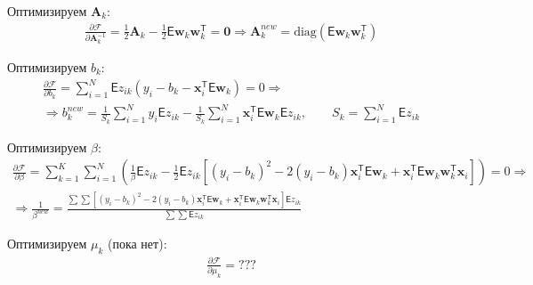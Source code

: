\documentclass[12pt, twoside]{article}
\numberwithin{equation}{section}
\begin{document}
Оптимизируем $\textbf{A}_k$:
\begin{equation}
\label{eq:st:20}
\begin{aligned}
\frac{\partial\mathcal{F}}{\partial\textbf{A}_k^{-1}} = \frac{1}{2}\textbf{A}_k -\frac{1}{2}\mathsf{E}\textbf{w}_k\textbf{w}_k^{\mathsf{T}} = \textbf{0}\Rightarrow \textbf{A}_k^{new} = \text{diag}(\mathsf{E}\textbf{w}_k\textbf{w}_k^{\mathsf{T}})
\end{aligned}
\end{equation}

Оптимизируем $b_k$:
\begin{equation}
\label{eq:st:21}
\begin{aligned}
\frac{\partial\mathcal{F}}{\partial b_k} = \sum_{i=1}^{N}\mathsf{E}z_{ik}\left(y_i-b_k -\textbf{x}_i^{\mathsf{T}}\mathsf{E}\textbf{w}_k\right) = 0 \Rightarrow \\
\Rightarrow b_k^{new}  = \frac{1}{S_k}\sum_{i=1}^{N}y_i\mathsf{E}z_{ik} -\frac{1}{S_k}\sum_{i=1}^{N}\textbf{x}_i^{\mathsf{T}}\mathsf{E}\textbf{w}_k\mathsf{E}z_{ik}, \qquad S_k = \sum_{i=1}^{N}\mathsf{E}z_{ik}
\end{aligned}
\end{equation}

Оптимизируем $\beta$:
\begin{equation}
\label{eq:st:22}
\begin{aligned}
\frac{\partial \mathcal{F}}{\partial \beta} = \sum_{k=1}^{K}\sum_{i=1}^{N}\left(\frac{1}{\beta}\mathsf{E}z_{ik} - \frac{1}{2}\mathsf{E}z_{ik}\left[\left(y_i-b_k\right)^2 -2\left(y_i-b_k\right)\textbf{x}_i^{\mathsf{T}}\mathsf{E}\textbf{w}_k+\textbf{x}_i^{\mathsf{T}}\mathsf{E}\textbf{w}_k\textbf{w}_k^{\mathsf{T}}\textbf{x}_i\right]\right) = 0 \Rightarrow \\
\Rightarrow \frac{1}{\beta^{new}} = \frac{\sum\sum\left[\left(y_i-b_k\right)^2 -2\left(y_i-b_k\right)\textbf{x}_i^{\mathsf{T}}\mathsf{E}\textbf{w}_k+\textbf{x}_i^{\mathsf{T}}\mathsf{E}\textbf{w}_k\textbf{w}_k^{\mathsf{T}}\textbf{x}_i\right]\mathsf{E}z_{ik}}{\sum\sum \mathsf{E}z_{ik}}
\end{aligned}
\end{equation}

Оптимизируем $\mu_k$ (пока нет):
\begin{equation}
\label{eq:st:23}
\begin{aligned}
\frac{\partial \mathcal{F}}{\partial \mu_k} = ???
\end{aligned}
\end{equation}
\end{document}
